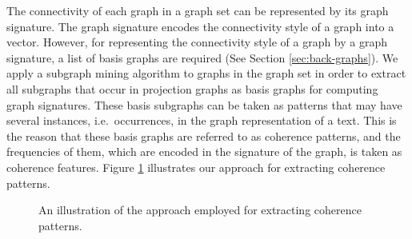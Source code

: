 The connectivity of each graph in a graph set can be represented by its graph signature.
The graph signature encodes the connectivity style of a graph into a vector. 
However, for representing the connectivity style of a graph by a graph signature, a list of basis graphs are required (See Section \ref{sec:back-graphs}).  
We apply a subgraph mining algorithm to graphs in the graph set in order to extract all subgraphs that occur in projection graphs as basis graphs for computing graph signatures. 
These basis subgraphs can be taken as patterns that may have several instances, i.e.\ occurrences, in the graph representation of a text.  
This is the reason that these basis graphs are referred to as coherence patterns, and the frequencies of them, which are encoded in the signature of the graph, is taken as coherence features. 
Figure \ref{fig:pattern-extraction} illustrates our approach for extracting coherence patterns.

\begin{figure}[!ht]
	\begin{center}
	\end{center}
	\caption{An illustration of the approach employed for extracting coherence patterns.}
	\label{fig:pattern-extraction}
\end{figure}


